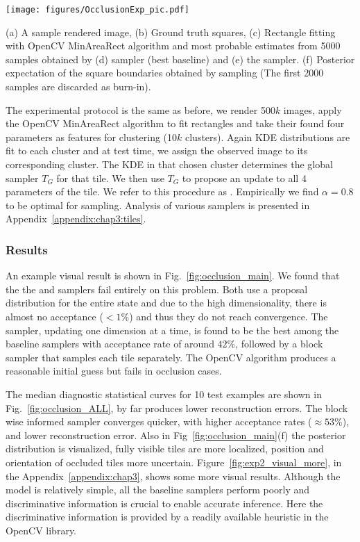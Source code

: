\begin{figure*}[th]
\begin{center}
\centerline{\texttt{[image: figures/OcclusionExp\_pic.pdf]}}
  {(a) A sample rendered image, (b) Ground truth squares, (c) Rectangle fitting
  with OpenCV MinAreaRect algorithm and
  most probable estimates from 5000 samples obtained by (d) \MHWG
  sampler (best baseline) and (e) the \INFBMHWG sampler. (f)
  Posterior expectation of the square boundaries obtained by \INFBMHWG
  sampling (The first 2000 samples are discarded as burn-in).}
\label{fig:occlusion_main}
\end{center}
\end{figure*}

The experimental protocol is the same as before, we render
500$k$ images, apply the OpenCV MinAreaRect algorithm to fit rectangles and take their
found four parameters as features for clustering (10$k$ clusters).
Again KDE distributions are fit to each cluster and at test time, we assign
the observed image to its corresponding
cluster.  The KDE in that chosen cluster determines the global sampler $T_G$
for that tile.  We then use $T_G$ to propose an update to all 4 parameters of
the tile. We refer to this procedure as
\INFBMHWG. Empirically we find $\alpha = 0.8$ to be optimal for \INFBMHWG sampling.
Analysis of various samplers is presented in Appendix~\ref{appendix:chap3:tiles}.

\subsubsection{Results}

An example visual result is shown in Fig.~\ref{fig:occlusion_main}.
We found that the the \MH and \MIXLMH samplers fail entirely on this
problem. Both use a proposal distribution for the entire state and due to the high
dimensionality, there is almost no acceptance ($< 1\%$) and thus they do
not reach convergence. The \MHWG sampler, updating one dimension at a time, is
found to be the best among the baseline samplers with acceptance rate of around $42\%$,
followed by a block sampler that samples each tile separately.
The OpenCV algorithm produces a reasonable initial guess but fails in
occlusion cases.
%

The median diagnostic statistical curves for 10 test examples are shown in
Fig.~\ref{fig:occlusion_ALL}, \INFBMHWG by far produces lower
reconstruction errors.
The block wise informed sampler \INFBMHWG converges quicker, with
higher acceptance rates ($\approx 53\%$), and lower reconstruction
error. Also in Fig~\ref{fig:occlusion_main}(f) the
posterior distribution is visualized, fully visible tiles are more
localized, position and orientation of occluded tiles more uncertain.
Figure~\ref{fig:exp2_visual_more}, in the Appendix~\ref{appendix:chap3},
shows some more visual results.
Although the model is relatively simple, all the baseline samplers
perform poorly and discriminative information is crucial to enable
accurate inference. Here the discriminative information is provided by a
readily available heuristic in the OpenCV library.

